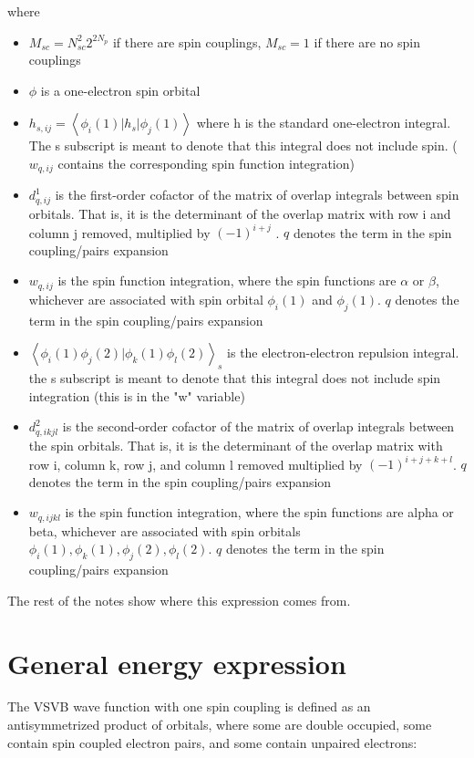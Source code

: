 \documentclass[a4paper]{article}
\begin{document}
where 
\begin{itemize}
\item $M_{sc} = N_{sc}^2 2^{2N_p}$ if there are spin couplings, $M_{sc} = 1$ if there are no spin couplings
\item $\phi$ is a one-electron spin orbital
\item $h_{s,ij} = \left< \phi_i(1) | h_s | \phi_j(1) \right>  $ where h is the standard one-electron integral. The s subscript is meant to denote that this integral does not include spin. ($w_{q,ij}$ contains the corresponding spin function integration)
\item $d^1_{q,ij} $ is the first-order cofactor of the matrix of overlap integrals between spin orbitals. That is, it is the determinant of the overlap matrix with row i and column j removed, multiplied by $(-1)^{i+j}$ . $q$ denotes the term in the spin coupling/pairs expansion 
\item $w_{q,ij}$ is the spin function integration, where the spin functions are $\alpha$ or $\beta$, whichever are associated with spin orbital $\phi_i(1)$ and $\phi_j(1)$. $q$ denotes the term in the spin coupling/pairs expansion
\item $ \left< \phi_i(1) \phi_j(2) | \phi_k(1) \phi_l(2) \right>_s$ is the electron-electron repulsion integral. the s subscript is meant to denote that this integral does not include spin integration (this is in the "w" variable)
\item $d^2_{q,ikjl} $ is the second-order cofactor of the matrix of overlap integrals between the spin orbitals. That is, it is the determinant of the overlap matrix with row i, column k, row j, and column l removed multiplied by $(-1)^{i+j+k+l}$. $q$ denotes the term in the spin coupling/pairs expansion
\item $ w_{q,ijkl} $ is the spin function integration, where the spin functions are alpha or beta, whichever are associated with spin orbitals $\phi_i(1),\phi_k(1),\phi_j(2),\phi_l(2)$. $q$ denotes the term in the spin coupling/pairs expansion
\end{itemize}

The rest of the notes show where this expression comes from.

\section{General energy expression}

The VSVB wave function with one spin coupling is defined as an antisymmetrized product of orbitals, where some are double occupied, some contain spin coupled electron pairs, and some contain unpaired electrons:
\end{document}
